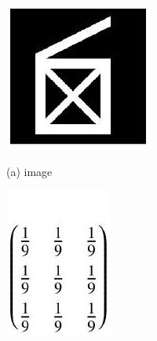 \documentclass[10pt]{article}
\begin{document}
\includegraphics[max width=\textwidth]{2022_01_06_b5ce182ed1bd5f482e5bg-19}

(a) image

\includegraphics[max width=\textwidth]{2022_01_06_b5ce182ed1bd5f482e5bg-19(1)}
\end{document}
